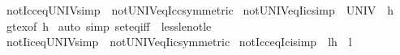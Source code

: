 \begin{isabellebody}
\endisatagproof
{\isafoldproof}%
%
\isadelimproof
\isanewline
%
\endisadelimproof
\isanewline
{}\isamarkupfalse%
\ not{\isacharunderscore}{\kern0pt}Icc{\isacharunderscore}{\kern0pt}eq{\isacharunderscore}{\kern0pt}UNIV{\isacharbrackleft}{\kern0pt}simp{\isacharbrackright}{\kern0pt}\ {\isacharequal}{\kern0pt}\ not{\isacharunderscore}{\kern0pt}UNIV{\isacharunderscore}{\kern0pt}eq{\isacharunderscore}{\kern0pt}Icc{\isacharbrackleft}{\kern0pt}symmetric{\isacharbrackright}{\kern0pt}\isanewline
\isanewline
{}\isamarkupfalse%
\ not{\isacharunderscore}{\kern0pt}UNIV{\isacharunderscore}{\kern0pt}eq{\isacharunderscore}{\kern0pt}Iic{\isacharbrackleft}{\kern0pt}simp{\isacharbrackright}{\kern0pt}{\isacharcolon}{\kern0pt}\ {\isachardoublequoteopen}{\isasymnot}\ UNIV\ {\isacharequal}{\kern0pt}\ {\isacharbraceleft}{\kern0pt}{\isachardot}{\kern0pt}{\isachardot}{\kern0pt}h{\isacharprime}{\kern0pt}{\isacharbraceright}{\kern0pt}{\isachardoublequoteclose}\isanewline
%
\isadelimproof
%
\endisadelimproof
%
\isatagproof
{}\isamarkupfalse%
\ gt{\isacharunderscore}{\kern0pt}ex{\isacharbrackleft}{\kern0pt}of\ h{\isacharprime}{\kern0pt}{\isacharbrackright}{\kern0pt}\ \isamarkupfalse%
{\isacharparenleft}{\kern0pt}auto\ simp{\isacharcolon}{\kern0pt}\ set{\isacharunderscore}{\kern0pt}eq{\isacharunderscore}{\kern0pt}iff\ \ less{\isacharunderscore}{\kern0pt}le{\isacharunderscore}{\kern0pt}not{\isacharunderscore}{\kern0pt}le{\isacharparenright}{\kern0pt}%
\endisatagproof
{\isafoldproof}%
%
\isadelimproof
\isanewline
%
\endisadelimproof
\isanewline
{}\isamarkupfalse%
\ not{\isacharunderscore}{\kern0pt}Iic{\isacharunderscore}{\kern0pt}eq{\isacharunderscore}{\kern0pt}UNIV{\isacharbrackleft}{\kern0pt}simp{\isacharbrackright}{\kern0pt}\ {\isacharequal}{\kern0pt}\ not{\isacharunderscore}{\kern0pt}UNIV{\isacharunderscore}{\kern0pt}eq{\isacharunderscore}{\kern0pt}Iic{\isacharbrackleft}{\kern0pt}symmetric{\isacharbrackright}{\kern0pt}\isanewline
\isanewline
{}\isamarkupfalse%
\ not{\isacharunderscore}{\kern0pt}Icc{\isacharunderscore}{\kern0pt}eq{\isacharunderscore}{\kern0pt}Ici{\isacharbrackleft}{\kern0pt}simp{\isacharbrackright}{\kern0pt}{\isacharcolon}{\kern0pt}\ {\isachardoublequoteopen}{\isasymnot}\ {\isacharbraceleft}{\kern0pt}l{\isachardot}{\kern0pt}{\isachardot}{\kern0pt}h{\isacharbraceright}{\kern0pt}\ {\isacharequal}{\kern0pt}\ {\isacharbraceleft}{\kern0pt}l{\isacharprime}{\kern0pt}{\isachardot}{\kern0pt}{\isachardot}{\kern0pt}{\isacharbraceright}{\kern0pt}{\isachardoublequoteclose}\isanewline
%

\end{isabellebody}
